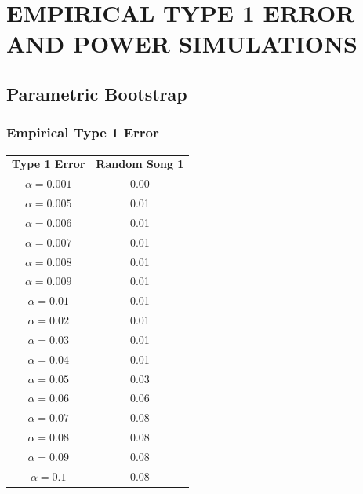 \documentclass[12pt, letterpaper]{article}
\begin{document}
\section{EMPIRICAL TYPE 1 ERROR AND POWER SIMULATIONS}

\subsection{Parametric Bootstrap}
\subsubsection{Empirical Type 1 Error} 

\begin{tabular}{|c|c|}
\textbf{Type 1 Error} & \textbf{Random Song 1}\\
$\alpha = 0.001$ & 0.00\\
$\alpha = 0.005$ &  0.01\\
$\alpha = 0.006$ &  0.01\\
$\alpha = 0.007$ & 0.01\\
$\alpha = 0.008$ & 0.01\\
$\alpha = 0.009$ & 0.01\\
$\alpha = 0.01$ & 0.01\\
$\alpha = 0.02$ & 0.01\\
$\alpha = 0.03$ & 0.01\\
$\alpha = 0.04$ & 0.01\\
$\alpha = 0.05$ &  0.03\\
$\alpha = 0.06$ &  0.06\\
$\alpha = 0.07$ &  0.08\\
$\alpha = 0.08$ &  0.08\\
$\alpha = 0.09$ & 0.08\\
$\alpha = 0.1$ & 0.08 \\
\end{tabular}
\end{document}
